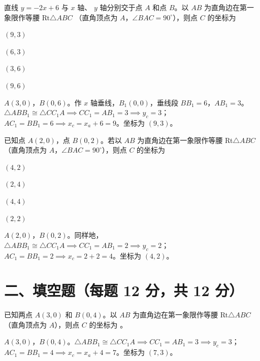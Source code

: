 \documentclass{exam-zh}
\begin{document}
\begin{question}[points=12]
  直线 $y = -2x + 6$ 与 $x$ 轴、 $y$ 轴分别交于点 $A$ 和点 $B$。以 $AB$ 为直角边在第一象限作等腰 Rt$\triangle ABC$ （直角顶点为 $A$，$\angle BAC = 90^\circ$），则点 $C$ 的坐标为
  \begin{choices}
    \item $(9, 3)$
    \item $(6, 3)$
    \item $(3, 6)$
    \item $(9, 6)$
  \end{choices}
  \paren[A]
  \begin{solutionblock}
    $A(3,0)$，$B(0,6)$。作 $x$ 轴垂线，$B_1(0,0)$，垂线段 $BB_1 = 6$，$AB_1 = 3$。\\ $\triangle ABB_1 \cong \triangle CC_1A \implies CC_1 = AB_1 = 3 \implies y_c = 3$；$AC_1 = BB_1 = 6 \implies x_c = x_a + 6 = 9$。坐标为 $(9, 3)$。
  \end{solutionblock}
\end{question}



\begin{question}[points=12]
  已知点 $A(2, 0)$，点 $B(0, 2)$。若以 $AB$ 为直角边在第一象限作等腰 Rt$\triangle ABC$ （直角顶点为 $A$，$\angle BAC = 90^\circ$），则点 $C$ 的坐标为
  \begin{choices}
    \item $(4, 2)$
    \item $(2, 4)$
    \item $(4, 4)$
    \item $(2, 2)$
  \end{choices}
  \paren[A]
  \begin{solutionblock}
    $A(2,0)$，$B(0,2)$。同样地，$\triangle ABB_1 \cong \triangle CC_1A \implies CC_1 = AB_1 = 2 \implies y_c = 2$；$AC_1 = BB_1 = 2 \implies x_c = 2+2=4$。坐标为 $(4, 2)$。
  \end{solutionblock}
\end{question}


\section*{二、填空题（每题 12 分，共 12 分）}


\begin{question}[points=12]
  已知两点 $A(3, 0)$ 和 $B(0, 4)$。以 $AB$ 为直角边在第一象限作等腰 Rt$\triangle ABC$ （直角顶点为 $A$），则点 $C$ 的坐标为 \fillin。
  \paren[$(7, 3)$]
  \begin{solutionblock}
    $A(3,0)$，$B(0,4)$。$\triangle ABB_1 \cong \triangle CC_1A \implies CC_1 = AB_1 = 3 \implies y_c = 3$；$AC_1 = BB_1 = 4 \implies x_c = x_a + 4 = 7$。坐标为 $(7, 3)$。
  \end{solutionblock}
\end{question}
\end{document}
